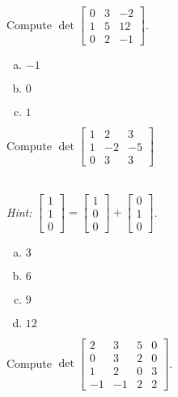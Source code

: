 \begin{applicationActivities}{2}{26}
\begin{activity}{5}
  Compute   $\det \begin{bmatrix} 0 & 3 & -2 \\ 1 & 5 & 12 \\ 0 & 2 & -1 \end{bmatrix}$.
  \ \\
  \begin{multicols}{3}
  \begin{enumerate}[(a)]
  \item $-1$
  \item $0$
  \item $1$
  \end{enumerate}
  \end{multicols}
\end{activity}

\begin{activity}{10}
  Compute $\det \begin{bmatrix} 1 & 2 & 3 \\ 1 & -2 & -5 \\ 0 & 3 & 3 \end{bmatrix}$

\ \\

  {\em Hint:} $\begin{bmatrix} 1 \\ 1 \\ 0 \end{bmatrix} = \begin{bmatrix} 1 \\ 0 \\ 0 \end{bmatrix} + \begin{bmatrix} 0 \\ 1 \\ 0 \end{bmatrix}$.

  \begin{multicols}{4}
  \begin{enumerate}[(a)]
  \item $3$
  \item $6$
  \item $9$
  \item $12$
  \end{enumerate}
  \end{multicols}
  \end{activity}

\begin{activity}{15}
  Compute  $\det \begin{bmatrix} 2 & 3 & 5 & 0 \\ 0 & 3 & 2 & 0 \\ 1 & 2 & 0 & 3 \\ -1 & -1 & 2 & 2 \end{bmatrix}$.


\end{activity}
\end{applicationActivities}
